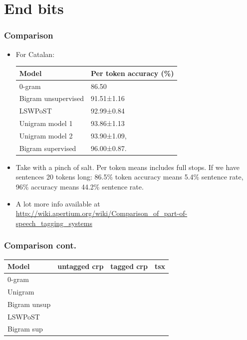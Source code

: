 \documentclass{beamer}
\newcommand{\cmark}{\textcolor{red}{\ding{51}}}%
\newcommand{\xmark}{\textcolor{green}{\ding{55}}}%
\begin{document}
\section{End bits}
\begin{frame}
\frametitle{Comparison}
\begin{itemize}

  \item For Catalan:

  \begin{table}
  \begin{tabular}{ll}
    Model & Per token accuracy (\%)\\
    \toprule
    0-gram & 86.50\\
    Bigram unsupervised & 91.51±1.16\\
    LSWPoST & 92.99±0.84\\
    Unigram model 1 & 93.86±1.13\\
    Unigram model 2 & 93.90±1.09,\\
    Bigram supervised & 96.00±0.87.
  \end{tabular}
  \end{table}

  \item Take with a pinch of salt. Per token means includes full stops. If we
    have sentences 20 tokens long: 86.5\% token accuracy means 5.4\% sentence
    rate, 96\% accuracy means 44.2\% sentence rate.

  \item A lot more info available at \url{http://wiki.apertium.org/wiki/Comparison_of_part-of-speech_tagging_systems}

\end{itemize}
\end{frame}

\begin{frame}
\frametitle{Comparison cont.}
\begin{table}
\begin{tabular}{llll}
  Model & untagged crp & tagged crp & tsx \\
  \toprule
  0-gram & \xmark & \xmark & \xmark\\
  Unigram & \xmark & \cmark & \xmark\\
  Bigram unsup & \cmark & \xmark & \cmark\\
  LSWPoST & \cmark & \xmark & \cmark\\
  Bigram sup & \xmark & \cmark & \cmark\\
\end{tabular}
\end{table}
\begin{itemize}

\end{itemize}
\end{frame}
\end{document}
